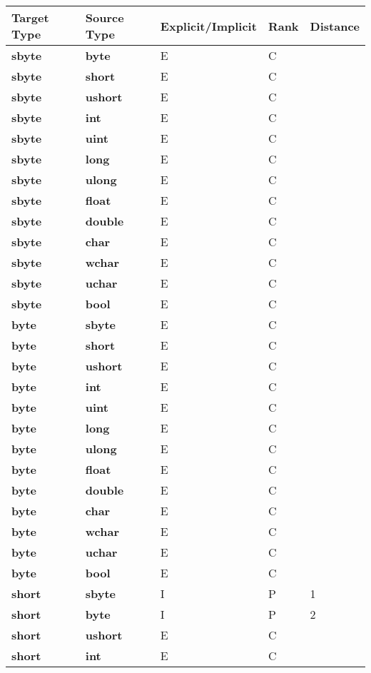 \documentclass[a4paper,oneside,11pt]{book}
\theoremstyle{definition}
\begin{document}
\begin{flushleft}
\begin{supertabular}{lllll}
\textbf{Target Type}& \textbf{Source Type}& \textbf{Explicit/Implicit}& \textbf{Rank}& \textbf{Distance}\\
\hline
\textbf{sbyte}& \textbf{byte}& E& C&\\
\textbf{sbyte}& \textbf{short}& E& C&\\
\textbf{sbyte}& \textbf{ushort}& E& C&\\
\textbf{sbyte}& \textbf{int}& E& C&\\
\textbf{sbyte}& \textbf{uint}& E& C&\\
\textbf{sbyte}& \textbf{long}& E& C&\\
\textbf{sbyte}& \textbf{ulong}& E& C&\\
\textbf{sbyte}& \textbf{float}& E& C&\\
\textbf{sbyte}& \textbf{double}& E& C&\\
\textbf{sbyte}& \textbf{char}& E& C&\\
\textbf{sbyte}& \textbf{wchar}& E& C&\\
\textbf{sbyte}& \textbf{uchar}& E& C&\\
\textbf{sbyte}& \textbf{bool}& E& C&\\
\hline
\textbf{byte}& \textbf{sbyte}& E& C&\\
\textbf{byte}& \textbf{short}& E& C&\\
\textbf{byte}& \textbf{ushort}& E& C&\\
\textbf{byte}& \textbf{int}& E& C&\\
\textbf{byte}& \textbf{uint}& E& C&\\
\textbf{byte}& \textbf{long}& E& C&\\
\textbf{byte}& \textbf{ulong}& E& C&\\
\textbf{byte}& \textbf{float}& E& C&\\
\textbf{byte}& \textbf{double}& E& C&\\
\textbf{byte}& \textbf{char}& E& C&\\
\textbf{byte}& \textbf{wchar}& E& C&\\
\textbf{byte}& \textbf{uchar}& E& C&\\
\textbf{byte}& \textbf{bool}& E& C&\\
\hline
\textbf{short}& \textbf{sbyte}& I& P&1\\
\textbf{short}& \textbf{byte}& I& P&2\\
\textbf{short}& \textbf{ushort}& E& C&\\
\textbf{short}& \textbf{int}& E& C&\\

\end{supertabular}
\end{flushleft}
\end{document}
